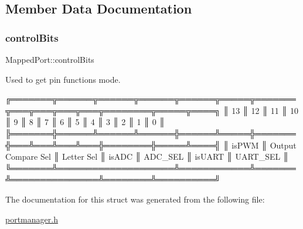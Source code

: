 \subsection{Member Data Documentation}
\mbox{\label{structMappedPort_ae73f042b9d9a8a1a87d489525a2ca947}} 
\subsubsection{\texorpdfstring{control\+Bits}{controlBits}}
{\footnotesize\ttfamily Mapped\+Port\+::control\+Bits}



Used to get pin functions mode. 

\begin{DoxyVerb}╔═══════╦══════╦══════╦══════╦══════╦═════╦═══════╦═══╦═══╦═══╦═══╦════════╦═════╦════╗
║ 13    ║ 12   ║ 11   ║ 10   ║ 9    ║ 8   ║ 7     ║ 6 ║ 5 ║ 4 ║ 3 ║ 2      ║ 1   ║ 0  ║
╠═══════╬══════╩══════╩══════╬══════╩═════╬═══════╬═══╩═══╩═══╩═══╬════════╬═════╩════╣
║ isPWM ║ Output Compare Sel ║ Letter Sel ║ isADC ║ ADC_SEL       ║ isUART ║ UART_SEL ║
╚═══════╩════════════════════╩════════════╩═══════╩═══════════════╩════════╩══════════╝
\end{DoxyVerb}
 

The documentation for this struct was generated from the following file\+:\begin{DoxyCompactItemize}
\item 
\hyperlink{portmanager_8h}{portmanager.\+h}\end{DoxyCompactItemize}
